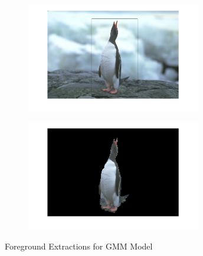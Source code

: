 \documentclass[a4paper]{article}
\begin{document}
\begin{figure}[h]
\begin{subfigure}{.5\textwidth}
  \centering
  \includegraphics[width = 3in]{penguin_in.png}
  \label{fig:sfig2}
\end{subfigure}
\begin{subfigure}{.5\textwidth}
  \centering
  \includegraphics[width = 3in]{penguin_out.png}
  \label{fig:sfig2}
\end{subfigure}

\caption{Foreground Extractions for GMM Model}
\end{figure}
\end{document}
